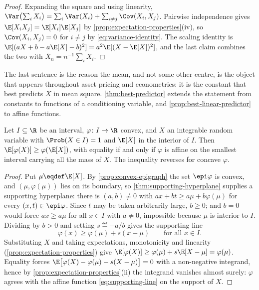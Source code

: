 \begin{proof}
	Expanding the square and using linearity,
	$\Var\bigl(\sum_iX_i\bigr)=\sum_i\Var(X_i)+\sum_{i\neq j}\Cov(X_i,X_j)$.
	Pairwise independence gives $\E[X_iX_j]=\E[X_i]\E[X_j]$ by
	\autoref{prop:expectation-properties}(iv), so
	$\Cov(X_i,X_j)=0$ for $i\neq j$ by \eqref{eq:variance-identity}. The scaling
	identity is $\E[(aX+b-a\E[X]-b)^{2}]=a^{2}\E[(X-\E[X])^{2}]$, and the last
	claim combines the two with $\bar X_n=n^{-1}\sum_iX_i$.
\end{proof}

The last sentence is the reason the mean, and not some other centre, is the
object that appears throughout asset pricing and econometrics: it is the constant
that best predicts $X$ in mean square. \autoref{thm:best-predictor} extends the
statement from constants to functions of a conditioning variable, and
\autoref{prop:best-linear-predictor} to affine functions.

\begin{theorem}\label{thm:jensen}
	Let $I\subseteq\R$ be an interval, $\varphi\colon I\to\R$ convex, and $X$ an
	integrable random variable with $\Prob(X\in I)=1$ and $\E[X]$ in the interior of
	$I$. Then $\E[\varphi(X)]\geq\varphi(\E[X])$, with equality if and only if
	$\varphi$ is affine on the smallest interval carrying all the mass of $X$. The
	inequality reverses for concave $\varphi$.
\end{theorem}

\begin{proof}
	Put $\mu\eqdef\E[X]$. By \autoref{prop:convex-epigraph} the set $\epi\varphi$ is
	convex, and $(\mu,\varphi(\mu))$ lies on its boundary, so
	\autoref{thm:supporting-hyperplane} supplies a supporting hyperplane: there is
	$(a,b)\neq0$ with $a x+b t\geq a\mu+b\varphi(\mu)$ for every
	$(x,t)\in\epi\varphi$. Since $t$ may be taken arbitrarily large, $b\geq0$; and
	$b=0$ would force $ax\geq a\mu$ for all $x\in I$ with $a\neq0$, impossible
	because $\mu$ is interior to $I$. Dividing by $b>0$ and setting
	$s\eqdef-a/b$ gives the supporting line
	\begin{equation}\label{eq:supporting-line}
		\varphi(x)\geq\varphi(\mu)+s(x-\mu)\qquad\text{for all }x\in I .
	\end{equation}
	Substituting $X$ and taking expectations, monotonicity and linearity
	(\autoref{prop:expectation-properties}) give
	$\E[\varphi(X)]\geq\varphi(\mu)+s\E[X-\mu]=\varphi(\mu)$. Equality forces
	$\E\bigl[\varphi(X)-\varphi(\mu)-s(X-\mu)\bigr]=0$ with a non-negative
	integrand, hence by \autoref{prop:expectation-properties}(ii) the integrand
	vanishes almost surely: $\varphi$ agrees with the affine function
	\eqref{eq:supporting-line} on the support of $X$.
\end{proof}

